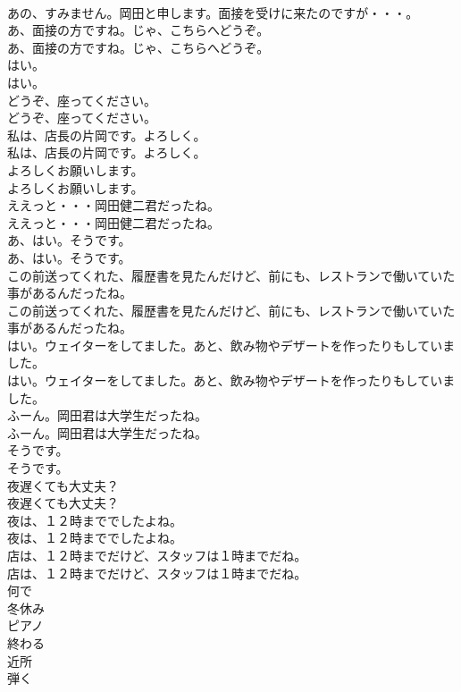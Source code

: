 \documentclass[8pt]{extreport}
\begin{document}
\begin{CJK}{UTF8}{min}
\\	あの、すみません。岡田と申します。面接を受けに来たのですが・・・。 
\\	あ、面接の方ですね。じゃ、こちらへどうぞ。	
\\	あ、面接の方ですね。じゃ、こちらへどうぞ。 
\\	はい。	
\\	はい。 
\\	どうぞ、座ってください。	
\\	どうぞ、座ってください。 
\\	私は、店長の片岡です。よろしく。	
\\	私は、店長の片岡です。よろしく。 
\\	よろしくお願いします。	
\\	よろしくお願いします。 
\\	ええっと・・・岡田健二君だったね。	
\\	ええっと・・・岡田健二君だったね。 
\\	あ、はい。そうです。	
\\	あ、はい。そうです。 
\\	この前送ってくれた、履歴書を見たんだけど、前にも、レストランで働いていた事があるんだったね。	
\\	この前送ってくれた、履歴書を見たんだけど、前にも、レストランで働いていた事があるんだったね。 
\\	はい。ウェイターをしてました。あと、飲み物やデザートを作ったりもしていました。	
\\	はい。ウェイターをしてました。あと、飲み物やデザートを作ったりもしていました。 
\\	ふーん。岡田君は大学生だったね。	
\\	ふーん。岡田君は大学生だったね。 
\\	そうです。	
\\	そうです。 
\\	夜遅くても大丈夫？	
\\	夜遅くても大丈夫？ 
\\	夜は、１２時まででしたよね。	
\\	夜は、１２時まででしたよね。 
\\	店は、１２時までだけど、スタッフは１時までだね。	
\\	店は、１２時までだけど、スタッフは１時までだね。 
\\	何で
\\	冬休み
\\	ピアノ
\\	終わる
\\	近所
\\	弾く

\end{CJK}
\end{document}
